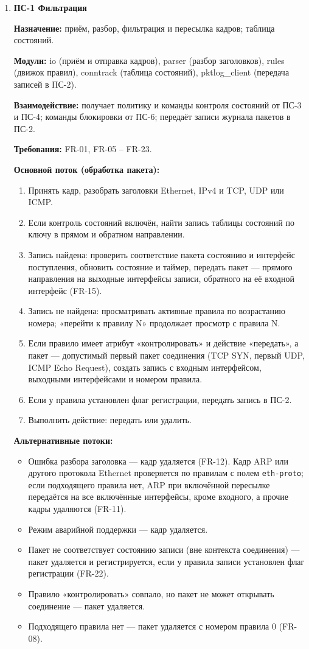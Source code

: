 \documentclass[13pt,a4paper,final]{article}
\begin{document}
	\begin{enumerate}
		\item 	\textbf{ПС-1 Фильтрация}
		
		\textbf{Назначение:} приём, разбор, фильтрация и пересылка кадров; таблица состояний.
		
		\textbf{Модули:} io (приём и отправка кадров), parser (разбор заголовков), rules (движок правил), conntrack (таблица состояний), pktlog\_client (передача записей в ПС-2).
		
		\textbf{Взаимодействие:} получает политику и команды контроля состояний от {ПС-3 и ПС-4}; команды блокировки от ПС-6; передаёт записи журнала пакетов в ПС-2.
		
		\textbf{Требования:} FR-01, FR-05 – FR-23.
		
		\textbf{Основной поток (обработка пакета):}
		\begin{enumerate}
			\item Принять кадр, разобрать заголовки Ethernet, IPv4 и TCP, UDP или ICMP.
			\item Если контроль состояний включён, найти запись таблицы состояний по ключу в прямом и обратном направлении.
			\item Запись найдена: проверить соответствие пакета состоянию и интерфейс поступления, обновить состояние и таймер, передать пакет — прямого направления на выходные интерфейсы записи, обратного на её входной интерфейс (FR-15).
			\item Запись не найдена: просматривать активные правила по возрастанию номера; «перейти к правилу N» продолжает просмотр с правила N.
			\item Если правило имеет атрибут «контролировать» и действие «передать», а пакет — допустимый первый пакет соединения (TCP SYN, первый UDP, ICMP Echo Request), создать запись с входным интерфейсом, выходными интерфейсами и номером правила.
			\item Если у правила установлен флаг регистрации, передать запись в ПС-2.
			\item Выполнить действие: передать или удалить.
		\end{enumerate}
		
		\textbf{Альтернативные потоки:}
		\begin{itemize}
			\item Ошибка разбора заголовка — кадр удаляется (FR-12). Кадр ARP или другого протокола Ethernet проверяется по правилам с полем \texttt{eth-proto}; если подходящего правила нет, ARP при включённой пересылке передаётся на все включённые интерфейсы, кроме входного, а прочие кадры удаляются (FR-11).
			\item Режим аварийной поддержки — кадр удаляется.
			\item Пакет не соответствует состоянию записи (вне контекста соединения) — пакет удаляется и регистрируется, если у правила записи установлен флаг регистрации (FR-22).
			\item Правило «контролировать» совпало, но пакет не может открывать соединение — пакет удаляется.
			\item Подходящего правила нет — пакет удаляется с номером правила 0 (FR-08).
		\end{itemize}
		

\end{enumerate}
\end{document}
